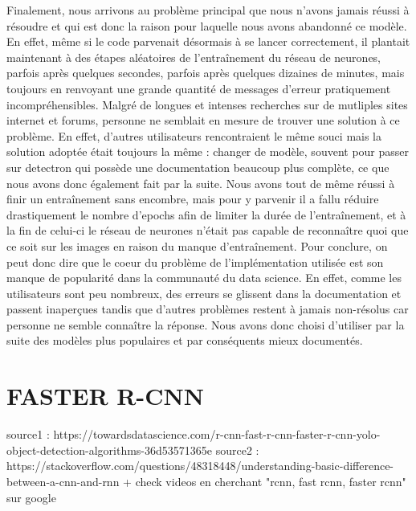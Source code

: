 Finalement, nous arrivons au problème principal que nous n'avons jamais réussi à résoudre et qui est donc la raison pour laquelle nous avons abandonné ce modèle. En effet, même si le code parvenait désormais à se lancer correctement, il plantait maintenant à des étapes aléatoires de l'entraînement du réseau de neurones, parfois après quelques secondes, parfois après quelques dizaines de minutes, mais toujours en renvoyant une grande quantité de messages d'erreur pratiquement incompréhensibles. Malgré de longues et intenses recherches sur de mutliples sites internet et forums, personne ne semblait en mesure de trouver une solution à ce problème. En effet, d'autres utilisateurs rencontraient le même souci mais la solution adoptée était toujours la même : changer de modèle, souvent pour passer sur detectron qui possède une documentation beaucoup plus complète, ce que nous avons donc également fait par la suite. Nous avons tout de même réussi à finir un entraînement sans encombre, mais pour y parvenir il a fallu réduire drastiquement le nombre d'epochs afin de limiter la durée de l'entraînement, et à la fin de celui-ci le réseau de neurones n'était pas capable de reconnaître quoi que ce soit sur les images en raison du manque d'entraînement.
Pour conclure, on peut donc dire que le coeur du problème de l'implémentation utilisée est son manque de popularité dans la communauté du data science. En effet, comme les utilisateurs sont peu nombreux, des erreurs se glissent dans la documentation et passent inaperçues tandis que d'autres problèmes restent à jamais non-résolus car personne ne semble connaître la réponse. Nous avons donc choisi d'utiliser par la suite des modèles plus populaires et par conséquents mieux documentés. 

\section{FASTER R-CNN}

source1 : https://towardsdatascience.com/r-cnn-fast-r-cnn-faster-r-cnn-yolo-object-detection-algorithms-36d53571365e \newline\newline
source2 : https://stackoverflow.com/questions/48318448/understanding-basic-difference-between-a-cnn-and-rnn \newline\newline
+ check videos en cherchant "rcnn, fast rcnn, faster rcnn" sur google






